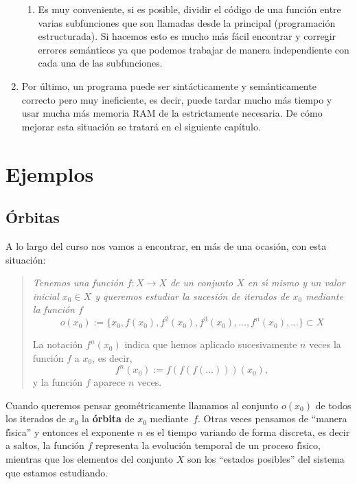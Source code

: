 \begin{enumerate}
\begin{enumerate}
\item Es muy conveniente, si es posible, dividir el código de una función
entre varias subfunciones que son llamadas desde la principal (programación
estructurada). Si hacemos esto es mucho más fácil encontrar y corregir
errores semánticos ya que podemos trabajar de manera independiente con cada
una de las subfunciones.



 
\end{enumerate}

 
\item Por último,  un programa puede ser sintácticamente y semánticamente
correcto pero muy ineficiente, es decir, puede tardar mucho más tiempo y usar
mucha más memoria RAM de la estrictamente necesaria. De cómo mejorar esta
situación se tratará en el siguiente capítulo.

 
 
\end{enumerate}


\section{Ejemplos}
\subsection{\'Orbitas}
\label{orbitas}
A lo largo del curso nos vamos a encontrar, en más de una ocasi\'on, con
esta situaci\'on:

\begin{quotation}
\itshape Tenemos una funci\'on $f:X\to X$ de un conjunto $X$ en s\'{\i} mismo y
un valor inicial $x_0\in X$ y queremos estudiar la sucesi\'on de iterados de
$x_0$ mediante la funci\'on $f$
\[o(x_0):=\{x_0,f(x_0),f^2(x_0),f^3(x_0),\dots,f^n(x_0),\dots\}\subset X\]

La notaci\'on $f^n(x_0)$ indica que hemos aplicado sucesivamente $n$ veces la funci\'on $f$ a $x_0$, es decir,
\[f^n(x_0):=f(f(f(\dots)))(x_0),\]
\noindent y la funci\'on $f$ aparece $n$ veces. 
\end{quotation}


Cuando queremos pensar geom\'etricamente llamamos al conjunto $o(x_0)$ de todos
los
iterados de $x_0$ la {\bf \'orbita} de $x_0$ mediante~$f$. Otras veces
pensamos de ``manera f\'{\i}sica'' y entonces el exponente $n$ es el tiempo
variando de forma discreta, es decir a saltos,  la funci\'on $f$ representa 
la evoluci\'on temporal de un proceso f\'{\i}sico,  mientras que los elementos
del conjunto $X$ son los ``estados posibles'' del sistema que estamos
estudiando. 

